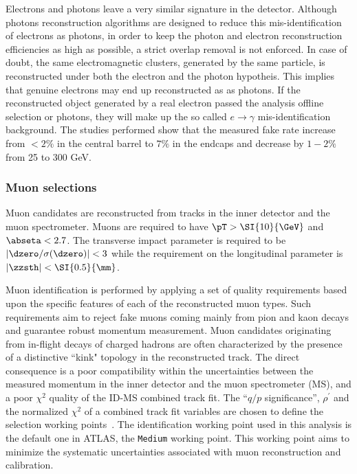 Electrons and photons leave a very similar signature in the detector. Although photons reconstruction
algorithms are designed to reduce this mis-identification of electrons as photons, in order to keep the
photon and electron reconstruction efficiencies as high as possible, a strict overlap removal is not enforced.
In case of doubt, the same electromagnetic clusters, generated by the same particle, is reconstructed under
both the electron and the photon hypotheis. This implies that genuine electrons may end up reconstructed
as as photons. If the reconstructed object generated by a real electron passed the analysis offline selection
or photons, they will make up the so called $e\to\gamma$ mis-identification background. The studies performed
show that the measured fake rate increase from $<2\% $ in the central barrel to $7\%$ in the endcaps and decrease
by $1-2\% $ from 25 to 300 GeV.

\subsubsection{Muon selections}

Muon candidates are reconstructed from tracks in the inner detector and the muon spectrometer. Muons are required to have $\pT>\SI{10}{\GeV}$ and $\abseta<2.7$. The transverse impact parameter is required to be  $\left|\dzero/\sigma(\dzero)\right|<3$ while the requirement on the longitudinal parameter is $\left|\zzsth\right|<\SI{0.5}{\mm}$.

Muon identification is performed by applying a set of quality requirements based upon the specific features of each of the reconstructed muon types. Such requirements aim to reject fake muons coming mainly from pion and kaon decays and guarantee robust momentum measurement. Muon candidates originating from in-flight decays of charged hadrons are often characterized by the presence of a distinctive ``kink" topology in the reconstructed track. The direct consequence is a poor compatibility within the uncertainties between the measured momentum in the inner detector and the muon spectrometer (MS), and a poor $\chi^2$ quality of the ID-MS combined track fit. The ``$q/p$ significance'', $\rho^{'}$ and the normalized $\chi^2$ of a combined track fit variables are chosen to define the selection working points~\cite{Bugge:2665711}. The identification working point used in this analysis is the default one in ATLAS, the \texttt{Medium} working point. This working point aims to minimize the systematic uncertainties associated with muon reconstruction and calibration.
 
